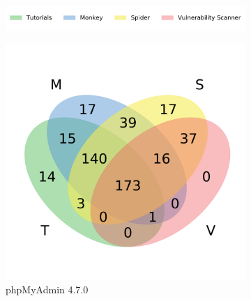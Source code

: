 \begin{figure}[t]
  \centering
  \begin{subfigure}[b]{0.7\textwidth}
      \includegraphics[width=\textwidth]{figures/venn_legend.pdf}
      \vspace{-5ex}
  \end{subfigure}
\par
    \begin{subfigure}[b]{0.22\textwidth}
        \includegraphics[width=\textwidth]{figures/venn_pma.pdf}
        \caption{\scriptsize{phpMyAdmin 4.7.0}}
        \label{fig:venn_pma}
    \end{subfigure}
    \begin{subfigure}[b]{0.22\textwidth}

\end{subfigure}
\end{figure}
